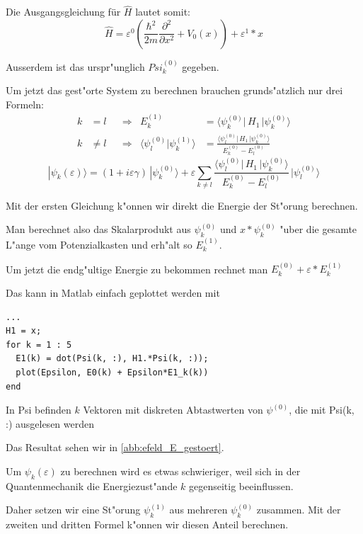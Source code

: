 \begin{refsection}
Die Ausgangsgleichung f\"ur $\hat{H}$ lautet somit:
\[
  \hat{H} = \varepsilon^0 ( \frac{\hbar^2}{2m} \frac{\partial^2}{\partial x^2} + V_0(x) )
            + \varepsilon^1*x
\]

Ausserdem ist das urspr"unglich $Psi_k^{(0)}$ gegeben.

Um jetzt das gest"orte System zu berechnen brauchen grunds"atzlich nur drei Formeln:
\begin{equation}
\begin{aligned}
k&=l
&&\Rightarrow&
E_k^{(1)}
&=
\langle \psi_k^{(0)}|\, H_1 \,|\psi_k^{(0)}\rangle
\\
k&\ne l
&&\Rightarrow&
\langle\psi_l^{(0)}|\psi_k^{(1)}\rangle
&=
\frac{\langle \psi_l^{(0)}|\, H_1 \,|\psi_k^{(0)}\rangle}{E_k^{(0)}-E_l^{(0)}}
\end{aligned}
\end{equation}
\begin{equation}
|\psi_k(\varepsilon)\rangle
=
(1+i\varepsilon \gamma)
\,|\psi_k^{(0)}\rangle
+
\varepsilon
\sum_{k\ne l}
\frac{\langle \psi_l^{(0)}|\, H_1 \,|\psi_k^{(0)}\rangle}{E_k^{(0)}-E_l^{(0)}}
\,
|\psi_l^{(0)}\rangle
\end{equation}

Mit der ersten Gleichung k"onnen wir direkt die Energie der St"orung berechnen.

Man berechnet also das Skalarprodukt aus $\psi_k^{(0)}$ und $x*\psi_k^{(0)}$ "uber die gesamte L"ange vom Potenzialkasten und erh"alt so $E_k^{(1)}$.

Um jetzt die endg"ultige Energie zu bekommen rechnet man $E_k^{(0)} + \varepsilon*E_k^{(1)}$

Das kann in Matlab einfach geplottet werden mit
\begin{lstlisting}[style=Matlab]
...
H1 = x;
for k = 1 : 5
  E1(k) = dot(Psi(k, :), H1.*Psi(k, :));
  plot(Epsilon, E0(k) + Epsilon*E1_k(k))
end
\end{lstlisting}
In Psi befinden $k$ Vektoren mit diskreten Abtastwerten von $\psi^{(0)}$, die mit Psi(k, :) ausgelesen werden

Das Resultat sehen wir in \ref{abb:efeld_E_gestoert}.

Um $\psi_k(\varepsilon)$ zu berechnen wird es etwas schwieriger, weil sich in der Quantenmechanik die Energiezust"ande $k$ gegenseitig beeinflussen.

Daher setzen wir eine St"orung $\psi_k^{(1)}$ aus mehreren $\psi_k^{(0)}$ zusammen.
Mit der zweiten und dritten Formel k"onnen wir diesen Anteil berechnen.


\end{refsection}
